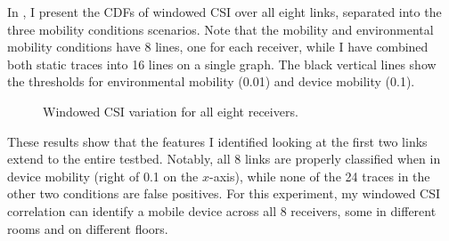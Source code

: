 In , I present the CDFs of windowed CSI over all eight links, separated into the three mobility conditions scenarios. Note that the mobility and environmental mobility conditions have 8 lines, one for each receiver, while I have combined both static traces into 16 lines on a single graph. The black vertical lines show the thresholds for environmental mobility (0.01) and device mobility (0.1).

\begin{figure}[tbp]
	\centering
	\hspace{0.03\textwidth}%
	\hspace{0.03\textwidth}%
	\caption[Windowed CSI variation for all eight receivers]{\label{fig:mobility_csi_alllinks_cdf}Windowed CSI variation for all eight receivers.}
\end{figure}

These results show that the features I identified looking at the first two links extend to the entire testbed. Notably, all 8 links are properly classified when in device mobility (right of 0.1 on the $x$-axis), while none of the 24 traces in the other two conditions are false positives. For this experiment, my windowed CSI correlation can identify a mobile device across all 8 receivers, some in different rooms and on different floors.

